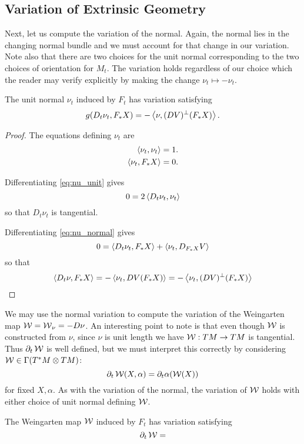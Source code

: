 \subsection*{Variation of Extrinsic Geometry}

Next, let us compute the variation of the normal. Again, the normal lies in the changing normal bundle and we must account for that change in our variation. Note also that there are two choices for the unit normal corresponding to the two choices of orientation for \(M_t\). The variation holds regardless of our choice which the reader may verify explicitly by making the change \(\nu_t \mapsto -\nu_t\).

\begin{lemma}
\label{lem:nu_t}
The unit normal \(\nu_t\) induced by \(F_t\) has variation satisfying
\[
g(D_t \nu_t, F_{\ast} X) = - \left\langle \nu,(DV)^{\perp} (F_{\ast} X) \right\rangle.
\]
\end{lemma}

\begin{proof}
The equations defining \(\nu_t\) are
\begin{align}
\label{eq:nu_unit}
\left\langle \nu_t,\nu_t \right\rangle &= 1. \\
\label{eq:nu_normal}
\left\langle \nu_t,F_{\ast} X \right\rangle &= 0.
\end{align}

Differentiating \eqref{eq:nu_unit} gives
\[
0 = 2 \left\langle D_t \nu_t,\nu_t \right\rangle
\]
so that \(D_t \nu_t\) is tangential.

Differentiating \eqref{eq:nu_normal} gives
\[
0 = \left\langle D_t \nu_t,F_{\ast} X \right\rangle + \left\langle \nu_t,D_{F_{\ast} X} V \right\rangle
\]
so that
\[
\left\langle D_t \nu,F_{\ast} X \right\rangle = - \left\langle \nu_t,DV(F_{\ast} X) \right\rangle = - \left\langle \nu_t,(DV)^{\perp}(F_{\ast} X) \right\rangle
\]
\end{proof}

We may use the normal variation to compute the variation of the Weingarten map \(\operatorname{\mathcal{W}} = \operatorname{\mathcal{W}}_{\nu} = -D\nu\). An interesting point to note is that even though \(\operatorname{\mathcal{W}}\) is constructed from \(\nu\), since \(\nu\) is unit length we have \(\operatorname{\mathcal{W}} : TM \to TM\) is tangential. Thus \(\partial_t \operatorname{\mathcal{W}}\) is well defined, but we must interpret this correctly by considering \(\operatorname{\mathcal{W}} \in \Gamma(T^{\ast} M \otimes TM)\):
\[
\partial_t \operatorname{\mathcal{W}} (X, \alpha) = \partial_t \alpha(\operatorname{\mathcal{W}}(X))
\]
for fixed \(X, \alpha\). As with the variation of the normal, the variation of \(\operatorname{\mathcal{W}}\) holds with either choice of unit normal defining \(\operatorname{\mathcal{W}}\).

\begin{lemma}
\label{lem:dt_W}
The Weingarten map \(\operatorname{\mathcal{W}}\) induced by \(F_t\) has variation satisfying
\[
\partial_t \operatorname{\mathcal{W}} =
\]
\end{lemma}

